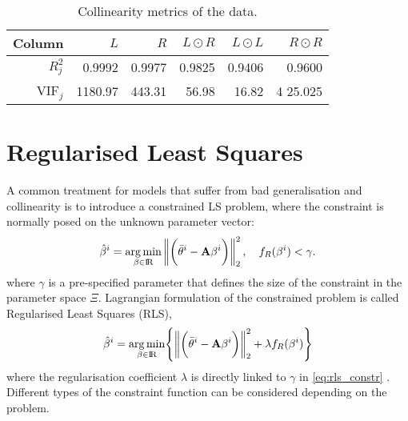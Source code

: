 \documentclass[a4paper,11pt,twoside]{article}
\newcommand{\norm}[1]{\left\lVert#1\right\rVert}
\DeclareMathOperator{\R}{\rm I\!R}
\theoremstyle{mytheoremstyle}
\begin{document}
\begin{table}[!h]
	\centering
	\caption{Collinearity metrics of the data.}\label{tab:vifs}
	\begin{tabular}{rrrrrr}
		Column & $L$ & $R$ & $L \odot R$ & $L \odot L$ & $R \odot R$ \\
		\hline
		$R^{2}_{j}$ & 0.9992 &   0.9977  &  0.9825  &  0.9406  & 0.9600 \\
		VIF$_j$ & 1180.97 &	443.31 &	56.98 &	16.82 &4	25.025 \\
		
		\hline
	\end{tabular}
\end{table}
\section{Regularised Least Squares}
\par A common treatment for models that suffer from bad generalisation and collinearity is to introduce a constrained LS problem, where the constraint is normally posed on the unknown parameter vector:
\begin{equation}\label{eq:rls_constr}
\hat{\mathbf{\beta}}^i = \underset{\beta \in \R}{\arg \min}\norm{ \biggl(\bar{\theta}^i - \mathbf{A} \mathbf{\beta}^i \biggr) }^{2}_{2}, \quad f_{R}(\mathbf{\beta}^i) < \gamma.
\end{equation}
where $\gamma$ is a pre-specified parameter that defines the size of the constraint in the parameter space $\Xi$.
Lagrangian formulation of the constrained problem is called Regularised Least Squares (RLS),
\begin{equation}\label{eq:rls_problem}
\hat{\mathbf{\beta}}^i = \underset{\beta \in \R}{\arg \min} \Biggl\{\norm{ \biggl(\bar{\theta}^i - \mathbf{A} \mathbf{\beta}^i \biggr) }^{2}_{2} + \lambda f_{R}(\mathbf{\beta}^i)\Biggr\}
\end{equation}
where the regularisation coefficient $\lambda$ is directly linked to  $\gamma$ in \eqref{eq:rls_constr} \cite{Seber2003}. Different types of the constraint function can be considered depending on the problem.
\end{document}
